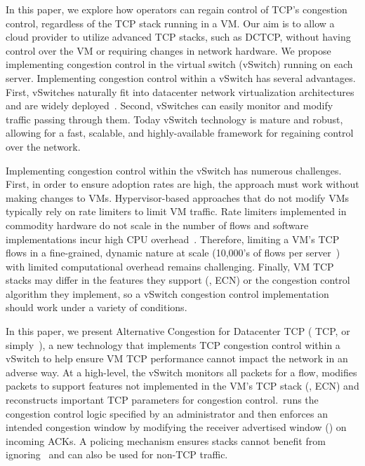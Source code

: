 In this paper, we explore how operators can regain control of TCP's congestion control, regardless of the TCP stack
running in a VM. Our aim is to allow a cloud provider to utilize advanced TCP stacks, such as DCTCP, without having
control over the VM or requiring changes in network hardware. We propose implementing congestion control in the virtual switch
(vSwitch) running on each server. Implementing congestion control within a vSwitch has several advantages. 
First, vSwitches naturally fit into datacenter network virtualization architectures and are widely
deployed~\cite{Pfaff2015ovs}. Second, vSwitches can easily monitor and modify traffic passing through them. 
Today vSwitch technology is mature and robust, allowing for a fast, scalable,
and highly-available framework for regaining control over the network. 


Implementing congestion control within the vSwitch has numerous challenges. First, in order to ensure adoption rates are high, the 
approach must work without making changes to VMs. 
Hypervisor-based approaches that do not modify VMs typically rely on rate limiters to limit VM traffic. Rate limiters implemented in
commodity hardware do not scale in the number of flows and software implementations incur high CPU overhead~\cite{radhakrishnan2014senic}. 
Therefore, limiting a VM's TCP flows in a fine-grained, dynamic nature
at scale (10,000's of flows per server~\cite{180302}) with limited computational overhead remains challenging. 
Finally, VM TCP stacks may differ in the features they support (\eg{}, ECN) or the congestion
control algorithm they implement, so a vSwitch congestion control implementation should work under a variety
of conditions. 

In this paper, we present Alternative Congestion for Datacenter TCP (\acdc{} TCP, or simply~\acdc{}), a new technology that implements 
TCP congestion control within a vSwitch to help ensure VM
TCP performance cannot impact the network in an adverse way. At a high-level, the vSwitch monitors all packets for a flow, modifies 
packets to support features not implemented in the VM's TCP stack (\eg{}, ECN) and reconstructs
important TCP parameters for congestion control.~\acdc runs the congestion control logic specified by an administrator and then enforces an intended
congestion window by modifying the receiver advertised window (\rwnd{}) on incoming ACKs. A policing
mechanism ensures stacks cannot benefit from ignoring~\rwnd{} and can also be used for non-TCP traffic.

